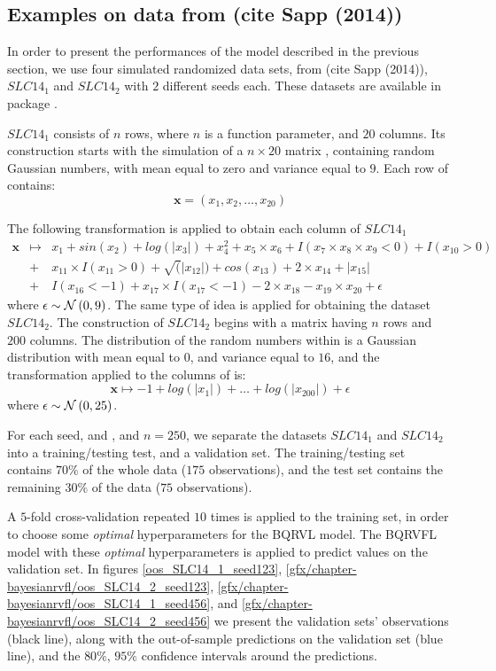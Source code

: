\newpage

\subsection{Examples on data from (cite Sapp (2014))}
\label{sec:sapp2014}

In order to present the performances of the model described in the previous section, we use four simulated randomized data sets, from (cite Sapp (2014)), $SLC14_1$ and $SLC14_2$ with $2$ different seeds each. These datasets are available in  package . 

$SLC14_1$ consists of $n$ rows, where $n$ is a function parameter, and $20$ columns. Its construction starts with the simulation of a $n \times 20$ matrix , containing random Gaussian numbers, with mean equal to zero and variance equal to $9$. Each row of  contains: 
$$
\textbf{x} = \left( x_1, x_2, \ldots, x_{20}\right) 
$$

The following transformation is applied to obtain each column of $SLC14_1$
\begin{eqnarray*}
 \textbf{x} &\mapsto& x_1 + sin(x_2) + log(|x_3|) + x_4^2 + x_5 \times x_6 +
I(x_7 \times x_8 \times x_9 < 0) + I(x_{10} > 0) \\
&+& x_{11} \times I(x_{11} > 0) + \sqrt(|x_{12}|) +
cos(x_{13}) + 2 \times x_{14} + |x_{15}| \\ 
&+& I(x_{16} < -1) + x_{17} \times I(x_{17} < -1) - 2  \times  x_{18}
- x_{19} \times x_{20} + \epsilon
\end{eqnarray*}
where $\epsilon \sim \mathcal{N}\left(0, 9\right)$. The same type of idea is applied for obtaining the dataset $SLC14_2$. The construction of $SLC14_2$ begins with a matrix  having $n$ rows and $200$ columns. The distribution of the random numbers within  is a Gaussian distribution with mean equal to $0$, and variance equal to $16$, and the transformation applied to the columns of  is: 
$$
\textbf{x} \mapsto -1 + log(|x_1|) + \ldots + log(|x_{200}|)  + \epsilon
$$
where $\epsilon \sim \mathcal{N}\left(0, 25\right)$.

For each seed,  and , and $n = 250$, we separate the datasets $SLC14_1$ and $SLC14_2$ into a training/testing test, and a validation set. The training/testing set contains $70\%$ of the whole data ($175$ observations), and the test set contains the remaining $30\%$ of the data ($75$ observations). 

A $5$-fold cross-validation repeated $10$ times is applied to the training set, in order to choose some \textit{optimal} hyperparameters for the BQRVL model. The BQRVFL model with these \textit{optimal} hyperparameters is applied to predict values on the validation set. In figures \ref{oos_SLC14_1_seed123}, \ref{gfx/chapter-bayesianrvfl/oos_SLC14_2_seed123}, \ref{gfx/chapter-bayesianrvfl/oos_SLC14_1_seed456}, and \ref{gfx/chapter-bayesianrvfl/oos_SLC14_2_seed456} we present the validation sets' observations (black line), along with the out-of-sample predictions on the validation set (blue line), and the $80\%$, $95\%$ confidence intervals around the predictions.

